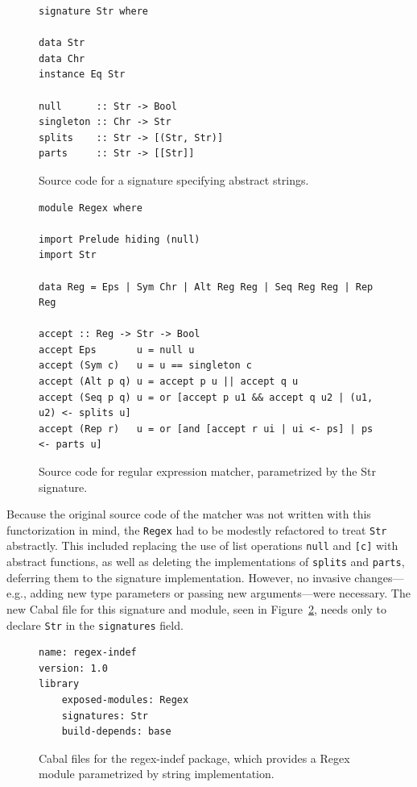 \begin{figure}
\begin{lstlisting}
signature Str where

data Str
data Chr
instance Eq Str

null      :: Str -> Bool
singleton :: Chr -> Str
splits    :: Str -> [(Str, Str)]
parts     :: Str -> [[Str]]
\end{lstlisting}
\caption{Source code for a signature specifying abstract strings.}

\begin{lstlisting}
module Regex where

import Prelude hiding (null)
import Str

data Reg = Eps | Sym Chr | Alt Reg Reg | Seq Reg Reg | Rep Reg

accept :: Reg -> Str -> Bool
accept Eps       u = null u
accept (Sym c)   u = u == singleton c
accept (Alt p q) u = accept p u || accept q u
accept (Seq p q) u = or [accept p u1 && accept q u2 | (u1, u2) <- splits u]
accept (Rep r)   u = or [and [accept r ui | ui <- ps] | ps <- parts u]
\end{lstlisting}
\caption{Source code for regular expression matcher, parametrized by the Str signature.}
\label{fig:matcher-regex-indef-source}
\end{figure}

Because the original source code of the matcher was not written with
this functorization in mind, the \verb|Regex| had to be modestly
refactored to treat \verb|Str| abstractly.  This included replacing the
use of list operations \verb|null| and \verb|[c]| with abstract
functions, as well as deleting the implementations of \verb|splits| and
\verb|parts|, deferring them to the signature implementation.  However,
no invasive changes---e.g., adding new type parameters or passing new
arguments---were necessary.  The new Cabal file for this signature and
module, seen in Figure~\ref{fig:matcher-regex-indef-cabal}, needs only
to declare \verb|Str| in the \verb|signatures| field.

\begin{figure}
\begin{lstlisting}[language=Cabal]
name: regex-indef
version: 1.0
library
    exposed-modules: Regex
    signatures: Str
    build-depends: base
\end{lstlisting}
\caption{Cabal files for the regex-indef package, which provides a Regex
module parametrized by string implementation.}
\label{fig:matcher-regex-indef-cabal}
\end{figure}

